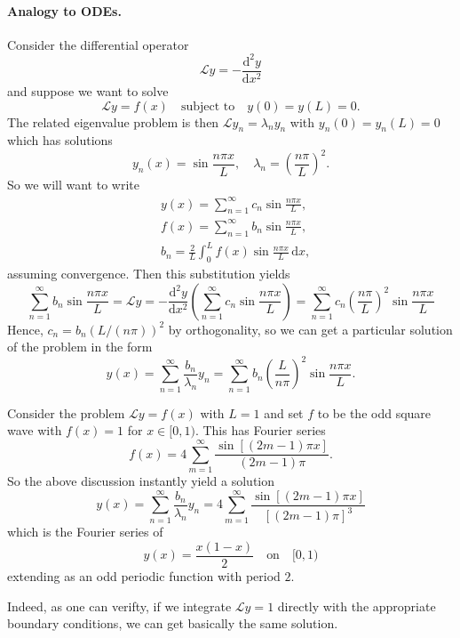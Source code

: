 \documentclass[a4paper]{article}
\begin{document}
\paragraph{Analogy to ODEs.}
Consider the differential operator
$$\mathcal Ly=-\frac{\mathrm d^2y}{\mathrm dx^2}$$
and suppose we want to solve
\begin{equation}
    \mathcal{L}y = f(x)\quad \text{subject to}\quad y(0)=y(L)=0.
\end{equation}
The related eigenvalue problem is then $\mathcal L y_n=\lambda_ny_n$ with $y_n(0)=y_n(L)=0$ which has solutions
\begin{equation}\label{1.eq.21}
    y_n(x)=\sin\frac{n\pi x}{L},\quad \lambda_n=\left( \frac{n\pi}{L} \right)^2.
\end{equation}
So we will want to write
\begin{align*}
    &y(x)=\sum_{n=1}^\infty c_n\sin\frac{n\pi x}{L},\\ 
    &f(x)=\sum_{n=1}^\infty b_n\sin\frac{n\pi x}{L},\\ 
    &b_n=\frac{2}{L}\int_0^Lf(x)\sin\frac{n\pi x}{L}\,\mathrm dx,
\end{align*}
assuming convergence.
Then this substitution yields
$$\sum_{n=1}^\infty b_n\sin\frac{n\pi x}{L}=\mathcal Ly=-\frac{\mathrm d^2y}{\mathrm dx^2}\left( \sum_{n=1}^\infty c_n\sin\frac{n\pi x}{L} \right)=\sum_{n=1}^\infty c_n\left( \frac{n\pi}{L} \right)^2\sin\frac{n\pi x}{L}$$
Hence, $c_n=b_n(L/(n\pi))^2$ by orthogonality, so we can get a particular solution of the problem in the form
\begin{equation}
    y(x)=\sum_{n=1}^\infty \frac{b_n}{\lambda_n}y_n = \sum_{n=1}^{\infty}b_n \left( \frac{L}{n\pi} \right)^2 \sin \frac{n\pi x}{L}.
\end{equation}
\begin{example}\label{odd_sq_fourier_ode}
    Consider the problem $ \mathcal{L}y=f(x) $ with $L=1$ and set $f$ to be the odd square wave with $f(x)=1$ for $x\in[0,1)$.
    This has Fourier series
    $$f(x)= 4\sum_{m=1}^\infty\frac{\sin[(2m-1)\pi x]}{(2m-1)\pi}.$$
    So the above discussion instantly yield a solution
    $$y(x)=\sum_{n=1}^\infty \frac{b_n}{\lambda_n}y_n=4\sum_{m=1}^\infty\frac{\sin[(2m-1)\pi x]}{[(2m-1)\pi]^3}$$
    which is the Fourier series of
    \begin{equation}
        y(x)=\frac{x(1-x)}{2}\quad \text{on}\quad[0,1)
    \end{equation}
    extending as an odd periodic function with period $2$.

    Indeed, as one can verifty, if we integrate $\mathcal L y=1$ directly with the appropriate boundary conditions, we can get basically the same solution.
\end{example}
\end{document}
